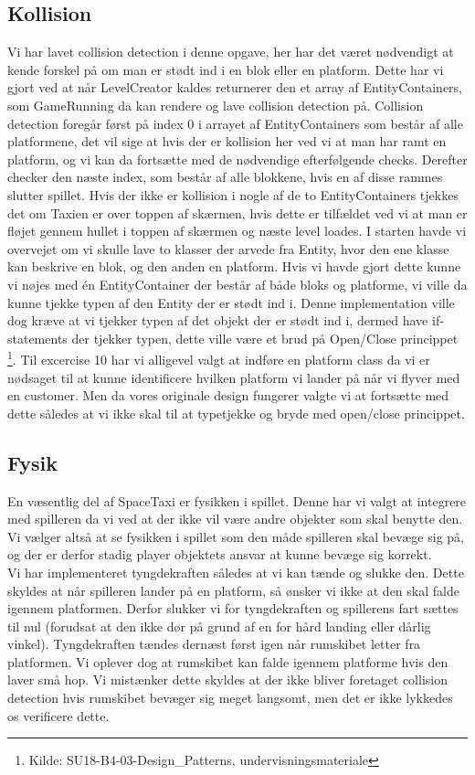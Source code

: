 \subsection{Kollision}
Vi har lavet collision detection i denne opgave, her har det været nødvendigt at kende forskel på om man er stødt ind i en blok eller en platform. Dette har vi gjort ved at når LevelCreator kaldes returnerer den et array af EntityContainers, som GameRunning da kan rendere og lave collision detection på. Collision detection foregår først på index 0 i arrayet af EntityContainers som består af alle platformene, det vil sige at hvis der er kollision her ved vi at man har ramt en platform, og vi kan da fortsætte med de nødvendige efterfølgende checks. Derefter checker den næste index, som består af alle blokkene, hvis en af disse rammes slutter spillet. Hvis der ikke er kollision i nogle af de to EntityContainers tjekkes det om Taxien er over toppen af skærmen, hvis dette er tilfældet ved vi at man er fløjet gennem hullet i toppen af skærmen og næste level loades. I starten havde vi overvejet om vi skulle lave to klasser der arvede fra Entity, hvor den ene klasse kan beskrive en blok, og den anden en platform. Hvis vi havde gjort dette kunne vi nøjes med én EntityContainer der består af både bloks og platforme, vi ville da kunne tjekke typen af den Entity der er stødt ind i. Denne implementation ville dog kræve at vi tjekker typen af det objekt der er stødt ind i, dermed have if-statements der tjekker typen, dette ville være et brud på Open/Close princippet \footnote{Kilde: SU18-B4-03-Design\_Patterns, undervisningsmateriale}. Til excercise 10 har vi alligevel valgt at indføre en platform class da vi er nødsaget til at kunne identificere hvilken platform vi lander på når vi flyver med en customer. Men da vores originale design fungerer valgte vi at fortsætte med dette således at vi ikke skal til at typetjekke og bryde med open/close princippet.\\

\subsection{Fysik}
   En væsentlig del af SpaceTaxi er fysikken i spillet. Denne har vi valgt at integrere med spilleren da vi ved at der ikke vil være andre objekter som skal benytte den. Vi vælger altså at se fysikken i spillet som den måde spilleren skal bevæge sig på, og der er derfor stadig player objektets ansvar at kunne bevæge sig korrekt.\\
   Vi har implementeret tyngdekraften således at vi kan tænde og slukke den. Dette skyldes at når spilleren lander på en platform, så ønsker vi ikke at den skal falde igennem platformen. Derfor slukker vi for tyngdekraften og spillerens fart sættes til nul (forudsat at den ikke dør på grund af en for hård landing eller dårlig vinkel). Tyngdekraften tændes dernæst først igen når rumskibet letter fra platformen. Vi oplever dog at rumskibet kan falde igennem platforme hvis den laver små hop. Vi mistænker dette skyldes at der ikke bliver foretaget collision detection hvis rumskibet bevæger sig meget langsomt, men det er ikke lykkedes os verificere dette.

